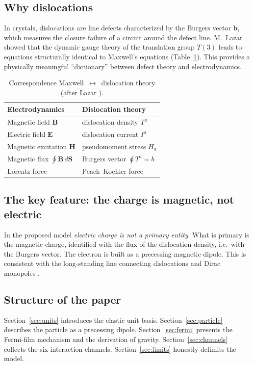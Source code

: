 \documentclass[12pt,a4paper]{article}
\begin{document}
\subsection{Why dislocations}
In crystals, dislocations are line defects characterized by the Burgers vector
$\mathbf{b}$, which measures the closure failure of a circuit around the defect
line. M.~Lazar \cite{lazar2010} showed that the dynamic gauge theory of the
translation group $T(3)$ leads to equations structurally identical to Maxwell's
equations (Table~\ref{tab:corr}). This provides a physically meaningful
``dictionary'' between defect theory and electrodynamics.

\begin{table}[h]
\centering
\caption{Correspondence Maxwell~$\leftrightarrow$~dislocation theory
(after Lazar \cite{lazar2010}).}
\label{tab:corr}
\begin{tabular}{ll}
\toprule
Electrodynamics & Dislocation theory \\
\midrule
Magnetic field $\mathbf{B}$ & dislocation density $T^a$ \\
Electric field $\mathbf{E}$ & dislocation current $I^a$ \\
Magnetic excitation $\mathbf{H}$ & pseudomoment stress $H_a$ \\
Magnetic flux $\oint\mathbf{B}\,d\mathbf{S}$ & Burgers vector $\oint T^a = b$ \\
Lorentz force & Peach--Koehler force \\
\bottomrule
\end{tabular}
\end{table}

\subsection{The key feature: the charge is magnetic, not electric}
In the proposed model \emph{electric charge is not a primary entity}. What is
primary is the magnetic charge, identified with the flux of the dislocation
density, i.e.\ with the Burgers vector. The electron is built as a precessing
magnetic dipole. This is consistent with the long-standing line connecting
dislocations and Dirac monopoles \cite{mistura1995}.

\subsection{Structure of the paper}
Section~\ref{sec:units} introduces the elastic unit basis.
Section~\ref{sec:particle} describes the particle as a precessing dipole.
Section~\ref{sec:fermi} presents the Fermi-film mechanism and the derivation of
gravity. Section~\ref{sec:channels} collects the six interaction channels.
Section~\ref{sec:limits} honestly delimits the model.
\end{document}
